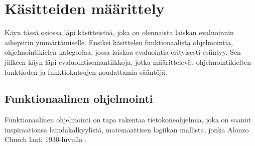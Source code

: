 \section{Käsitteiden määrittely}\label{kasitteisto}

Käyn tässä osiossa läpi käsitteistöä, joka on olennaista laiskan evaluoinnin aihepiirin ymmärtämiselle. Ensiksi käsittelen funktionaalista ohjelmointia, ohjelmointikielen kategoriaa, jossa laiskaa evaluointia erityisesti esiintyy. Sen jälkeen käyn läpi evaluointisemantiikkoja, jotka määrittelevät ohjelmointikielten funktioden ja funktiokutsujen noudattamia sääntöjä.


\subsection{Funktionaalinen ohjelmointi}
Funktionaalinen ohjelmointi on tapa rakentaa tietokoneohjelmia, joka on saanut inspiraationsa lamdakalkyylistä, matemaattisen logiikan mallista, jonka Alonzo Church laati 1930-luvulla \citep{church1932set}.

